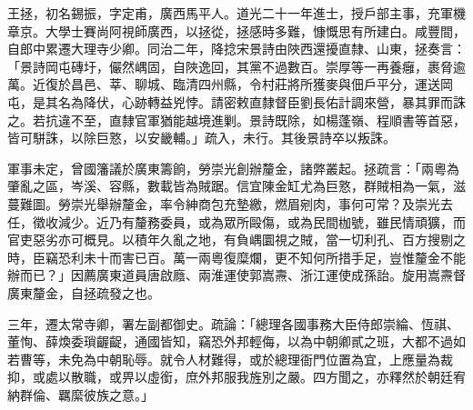 \begin{pinyinscope}
王拯，初名錫振，字定甫，廣西馬平人。道光二十一年進士，授戶部主事，充軍機章京。大學士賽尚阿視師廣西，以拯從，拯感時多難，慷慨思有所建白。咸豐間，自郎中累遷大理寺少卿。同治二年，降捻宋景詩由陜西還擾直隸、山東，拯奏言：「景詩岡屯磚圩，儼然嵎固，自陜逸回，其黨不過數百。崇厚等一再養癰，裹脅逾萬。近復於昌邑、莘、聊城、臨清四州縣，令村莊將所獲麥與佃戶平分，運送岡屯，是其名為降伏，心跡轉益兇悖。請密敕直隸督臣劉長佑計調來營，暴其罪而誅之。若抗違不至，直隸官軍猶能越境進剿。景詩既除，如楊蓬嶺、程順書等首惡，皆可駢誅，以除巨憝，以安畿輔。」疏入，未行。其後景詩卒以叛誅。

軍事未定，曾國籓議於廣東籌餉，勞崇光創辦釐金，諸弊叢起。拯疏言：「兩粵為肇亂之區，岑溪、容縣，數載皆為賊踞。信宜陳金缸尤為巨憝，群賊相為一氣，滋蔓難圖。勞崇光舉辦釐金，率令紳商包充墊繳，燃眉剜肉，事何可常？及崇光去任，徵收減少。近乃有釐務委員，或為眾所毆傷，或為民間枷號，雖民情頑獷，而官吏惡劣亦可概見。以積年久亂之地，有負嵎圜視之賊，當一切利孔、百方搜剔之時，臣竊恐利未十而害已百。萬一兩粵復糜爛，更不知何所措手足，豈惟釐金不能辦而已？」因薦廣東道員唐啟廕、兩淮運使郭嵩燾、浙江運使成孫詒。旋用嵩燾督廣東釐金，自拯疏發之也。

三年，遷太常寺卿，署左副都御史。疏論：「總理各國事務大臣侍郎崇綸、恆祺、董恂、薛煥委瑣齷齪，通國皆知，竊恐外邦輕侮，以為中朝卿貳之班，大都不過如若曹等，未免為中朝恥辱。就令人材難得，或於總理衙門位置為宜，上應量為裁抑，或處以散職，或畀以虛銜，庶外邦服我旌別之嚴。四方聞之，亦釋然於朝廷宥納群倫、羈縻彼族之意。」


\end{pinyinscope}
